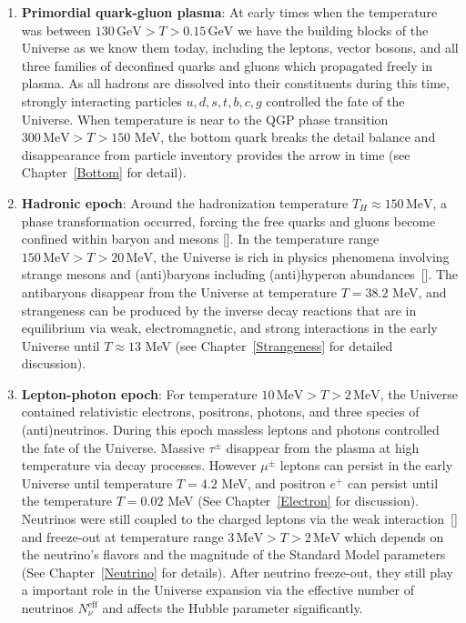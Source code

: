\begin{enumerate}
    \item \textbf{Primordial quark-gluon plasma}: 
    At early times when the temperature was between $130\,\mathrm{GeV}>T>0.15\,\mathrm{GeV}$ we have the building blocks of the Universe as we know them today, including the leptons, vector bosons, and all three families of deconfined quarks and gluons which propagated freely in plasma. As all hadrons are dissolved into their constituents during this time, strongly interacting particles $u,d,s,t,b,c,g$ controlled the fate of the Universe. When temperature is near to the QGP phase transition $300\, \mathrm{MeV}>T>150$ MeV, the bottom quark  breaks the detail balance and disappearance from particle inventory provides the arrow in time (see Chapter~\ref{Bottom} for detail).
    
    \item \textbf{Hadronic epoch}: Around the hadronization temperature $T_H\approx150\,\mathrm{MeV}$, a phase transformation occurred, forcing 
    the free quarks and gluons become confined within baryon and mesons [\cite{Letessier:2005qe}]. In the temperature range $ 150\,\mathrm{MeV}>T>20\,\mathrm{MeV}$, the Universe is rich in physics phenomena involving strange mesons and (anti)baryons including (anti)hyperon abundances~[\cite{Fromerth:2012fe,Yang:2021bko}]. The antibaryons disappear from the Universe at temperature $T=38.2$ MeV, and strangeness can be produced by the inverse decay reactions that are in equilibrium via weak, electromagnetic, and strong interactions in the early Universe until $T\approx13$ MeV (see Chapter~\ref{Strangeness} for detailed discussion).

    
    \item \textbf{Lepton-photon epoch}: For temperature $10\,\mathrm{MeV}>T>2\,\mathrm{MeV}$, the Universe contained relativistic electrons, positrons, photons, and three species of (anti)neutrinos. During this epoch massless leptons and photons controlled the fate of the Universe. Massive $\tau^\pm$ disappear from the plasma at high temperature via decay processes. However $\mu^\pm$ leptons can persist in the early Universe until temperature $T=4.2$ MeV, and positron $e^+$ can persist until the temperature $T=0.02$ MeV (See Chapter~\ref{Electron} for discussion).
    Neutrinos were still coupled to the charged leptons via the weak interaction~[\cite{Birrell:2012gg,Birrell:2014ona}] and freeze-out at temperature range $3\,\mathrm{MeV}>T>2\,\mathrm{MeV}$ which depends on the neutrino's flavors and the magnitude of the Standard Model parameters (See Chapter~\ref{Neutrino} for details). After neutrino freeze-out, they still play a important role in the Universe expansion via the effective number of neutrinos $N_{\nu}^{\mathrm{eff}}$ and affects the Hubble parameter significantly.  
    

\end{enumerate}

